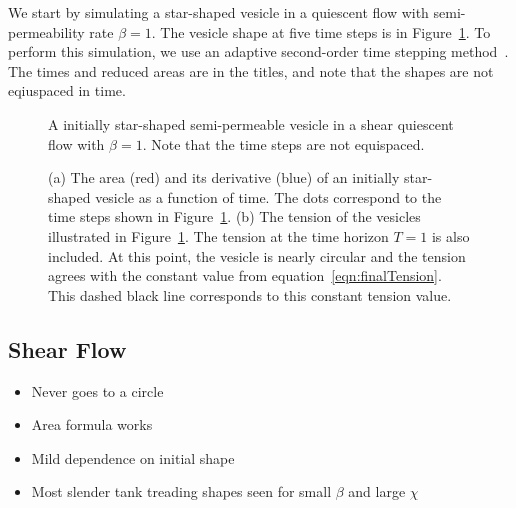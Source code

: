 \documentclass[aps,prl,showpacs]{revtex4}
\begin{document}
We start by simulating a star-shaped vesicle in a quiescent flow with
semi-permeability rate $\beta=1$. The vesicle shape at five time
steps is in Figure~\ref{fig:starShape}. To perform this simulation,
we use an adaptive second-order time stepping
method~\cite{qua-bir2016}. The times and reduced areas are
in the titles, and note that the shapes are not eqiuspaced in time.

\begin{figure}[htp]
  \begin{center}
    
    
    
    
    
  \end{center}
  \caption{\label{fig:starShape} A initially star-shaped
  semi-permeable vesicle in a shear quiescent flow with $\beta=1$. Note
  that the time steps are not equispaced.}
\end{figure}


\begin{figure}[htp]
  
  \qquad
  
  \caption{\label{fig:starArea} (a) The area (red) and its derivative
  (blue) of an initially star-shaped vesicle as a function of time. The
  dots correspond to the time steps shown in Figure~\ref{fig:starShape}.
  (b) The tension of the vesicles illustrated in
  Figure~\ref{fig:starShape}.  The tension at the time horizon $T=1$ is
  also included. At this point, the vesicle is nearly circular and the
  tension agrees with the constant value from
  equation~\eqref{eqn:finalTension}. This dashed black line corresponds
  to this constant tension value.}
\end{figure}




\subsection{Shear Flow}
\begin{itemize}
  \item Never goes to a circle
  \item Area formula works
  \item Mild dependence on initial shape
  \item Most slender tank treading shapes seen for small $\beta$ and
    large $\chi$
\end{itemize}
\end{document}

